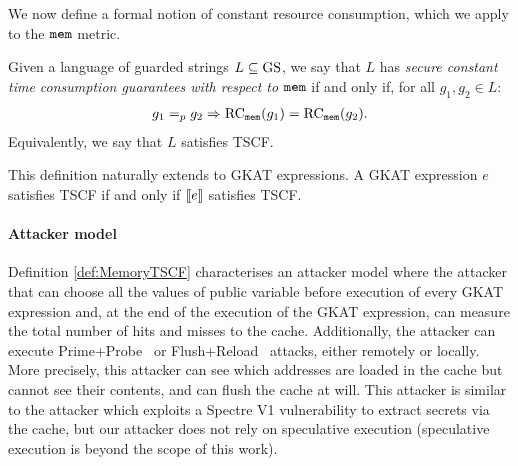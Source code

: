 We now define a formal notion of constant resource consumption, which we apply to the $\texttt{mem}$ metric.
\begin{definition}
    \label{def:MemoryTSCF}
Given a language of guarded strings $L\subseteq \text{GS}$, we say that $L$ has \emph{secure constant time consumption guarantees with respect to $\texttt{mem}$} if and only if, for all $g_1, g_2 \in L:$
\begin{align*}
\label{eq:WSRC}
g_1=_p g_2\Rightarrow\text{RC}_{\texttt{mem}}(g_1)=\text{RC}_{\texttt{mem}}(g_2).
\end{align*}
Equivalently, we say that $L$ satisfies TSCF.
\end{definition}
This definition naturally extends to GKAT expressions. A GKAT expression $e$ satisfies TSCF if and only if $\llbracket e\rrbracket$ satisfies TSCF. 



\paragraph*{Attacker model} Definition \ref{def:MemoryTSCF} characterises an attacker model where 
the attacker that can choose all the values of public variable before execution of every GKAT expression and, at the end of the execution of the GKAT expression, can measure the total number of hits and misses to the cache. Additionally, the attacker can execute Prime+Probe~\cite{prime-probe} or Flush+Reload~\cite{Flush+Reload} attacks, either remotely or locally. More precisely, this attacker can see which addresses are loaded in the cache but cannot see their contents, and can flush the cache at will. This attacker is similar to the attacker which exploits a Spectre V1 vulnerability to extract secrets via the cache, but our attacker does not rely on speculative execution (speculative execution is beyond the scope of this work). 

